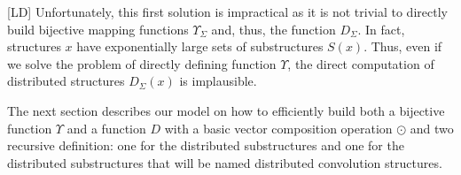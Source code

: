 \documentclass[twoside,11pt]{article}
\def\vec#1{\mathbf{#1}}
\def\svec#1{\vec{#1}}
\def\smallvectors#1{\mathcal{#1}}
\def\R{\mathbb{R}}
\def\df{\Upsilon}
\def\mo{\odot}
\def\comment#1#2{}
\def\finalcomment#1#2{}
\def\myremove#1{}
\def\myinsert#1{#1}
\def\meta#1{\noindent\textbf{FLUSSO}: \emph{#1}}
\def\mysecondremove#1{}
\def\mysecondinsert#1{#1}
\def\LD#1{[{\color{blue}L}D] {\color{blue}#1}}
\begin{document}

\LD{Unfortunately, this first solution is impractical as it is not trivial to directly build bijective mapping functions $\df_{\Sigma}$ and, thus, the function $D_{\Sigma}$.} 
In fact, structures $x$ have exponentially large sets of substructures $S(x)$. Thus, even if we solve the problem of directly defining function $\df$, the direct computation of distributed structures $D_{\Sigma}(x)$ is implausible. 

The next section describes our model on how to efficiently build both a bijective function $\df$ and a function $D$ with a basic vector composition operation $\mo$ and two recursive definition: one for the distributed substructures and one for the distributed substructures that will be named distributed convolution structures. 



\end{document}
